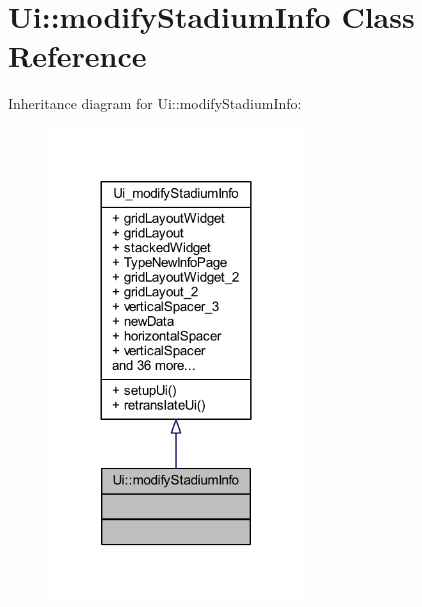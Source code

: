 \hypertarget{class_ui_1_1modify_stadium_info}{}\section{Ui\+:\+:modify\+Stadium\+Info Class Reference}
\label{class_ui_1_1modify_stadium_info}


Inheritance diagram for Ui\+:\+:modify\+Stadium\+Info\+:
\nopagebreak
\begin{figure}[H]
\begin{center}
\leavevmode
\includegraphics[width=192pt]{class_ui_1_1modify_stadium_info__inherit__graph}
\end{center}
\end{figure}


